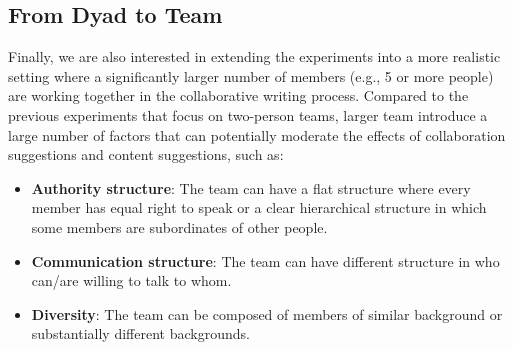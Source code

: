 \subsection{From Dyad to Team}
\label{sec:exp4}
Finally, we are also interested in extending the experiments into a more realistic setting where a significantly larger number of members (e.g., 5 or more people) are working together in the collaborative writing process. Compared to the previous experiments that focus on two-person teams, larger team introduce a large number of factors that can potentially moderate the effects of collaboration suggestions and content suggestions, such as:
\begin{itemize}
\item{\bf Authority structure}: The team can have a flat structure where every member has equal right to speak or a clear hierarchical structure in which some members are subordinates of other people.
\item{\bf Communication structure}: The team can have different structure in who can/are willing to talk to whom.
\item{\bf Diversity}: The team can be composed of members of similar background or substantially different backgrounds.
\end{itemize}